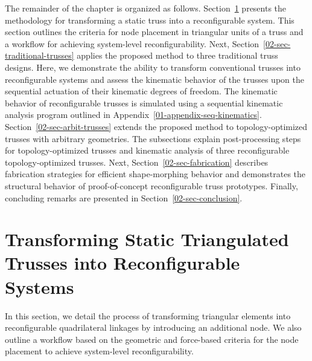 The remainder of the chapter is organized as follows. Section~\ref{02-sec-node-placement} presents the methodology for transforming a static truss into a reconfigurable system. This section outlines the criteria for node placement in triangular units of a truss and a workflow for achieving system-level reconfigurability. Next, Section~\ref{02-sec-traditional-trusses} applies the proposed method to three traditional truss designs. Here, we demonstrate the ability to transform conventional trusses into reconfigurable systems and assess the kinematic behavior of the trusses upon the sequential actuation of their kinematic degrees of freedom. The kinematic behavior of reconfigurable trusses is simulated using a sequential kinematic analysis program outlined in Appendix~\ref{01-appendix-seq-kinematics}. Section~\ref{02-sec-arbit-trusses} extends the proposed method to topology-optimized trusses with arbitrary geometries. The subsections explain post-processing steps for topology-optimized trusses and kinematic analysis of three reconfigurable topology-optimized trusses. Next, Section~\ref{02-sec-fabrication} describes fabrication strategies for efficient shape-morphing behavior and demonstrates the structural behavior of proof-of-concept reconfigurable truss prototypes. Finally, concluding remarks are presented in Section~\ref{02-sec-conclusion}.

\section{Transforming Static Triangulated Trusses into Reconfigurable Systems}\label{02-sec-node-placement}
In this section, we detail the process of transforming triangular elements into reconfigurable quadrilateral linkages by introducing an additional node. We also outline a workflow based on the geometric and force-based criteria for the node placement to achieve system-level reconfigurability.

